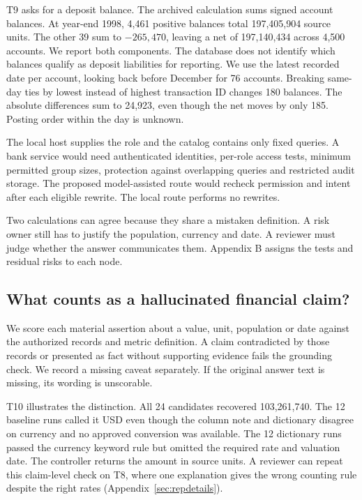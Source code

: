 \documentclass[11pt,a4paper,onecolumn,oneside]{rho-class/rho}
\begin{document}
T9 asks for a deposit balance. The archived calculation sums signed account balances. At year-end 1998, 4,461 positive balances total 197,405,904 source units. The other 39 sum to $-265{,}470$, leaving a net of 197,140,434 across 4,500 accounts. We report both components. The database does not identify which balances qualify as deposit liabilities for reporting. We use the latest recorded date per account, looking back before December for 76 accounts. Breaking same-day ties by lowest instead of highest transaction ID changes 180 balances. The absolute differences sum to 24,923, even though the net moves by only 185. Posting order within the day is unknown.

The local host supplies the role and the catalog contains only fixed queries. A bank service would need authenticated identities, per-role access tests, minimum permitted group sizes, protection against overlapping queries and restricted audit storage. The proposed model-assisted route would recheck permission and intent after each eligible rewrite. The local route performs no rewrites.

Two calculations can agree because they share a mistaken definition. A risk owner still has to justify the population, currency and date. A reviewer must judge whether the answer communicates them. Appendix B assigns the tests and residual risks to each node.

\subsection{What counts as a hallucinated financial claim?}
We score each material assertion about a value, unit, population or date against the authorized records and metric definition. A claim contradicted by those records or presented as fact without supporting evidence fails the grounding check. We record a missing caveat separately. If the original answer text is missing, its wording is unscorable.

T10 illustrates the distinction. All 24 candidates recovered 103,261,740. The 12 baseline runs called it USD even though the column note and dictionary disagree on currency and no approved conversion was available. The 12 dictionary runs passed the currency keyword rule but omitted the required rate and valuation date. The controller returns the amount in source units. A reviewer can repeat this claim-level check on T8, where one explanation gives the wrong counting rule despite the right rates (Appendix~\ref{sec:repdetails}).
\end{document}
